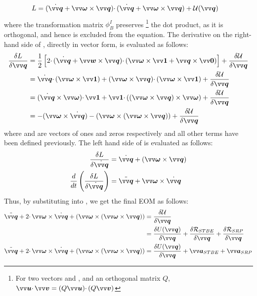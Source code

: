 \begin{align}
    L &= (\dot{\bv{q}} + \bv{\omega} \times \bv{q}) \cdotp (\dot{\bv{q}} + \bv{\omega} \times \bv{q}) + \mathcal{U}(\bv{q})
    \label{eqn:lagrange_arf}
\end{align}
where the transformation matrix $\phi_B^I$ preserves \footnote{For two vectors  and , and an orthogonal matrix $Q$, $\bv{u} \cdotp \bv{v} = (Q\bv{u}) \cdotp (Q\bv{v})$} the dot product, as it is orthogonal, and hence is excluded from the equation. The derivative on the right-hand side of , directly in vector form, is evaluated as follows:
\begin{align}
    \frac{\delta L}{\delta \bv{q}} &= \frac{1}{2} \left[ 2 \cdotp (\dot{\bv{q}} + \bv{w} \times \bv{q}) \cdotp (\bv{\omega} \times \bv{1} + \bv{q} \times {\bv{0}}) \right] + \frac{\delta \mathcal{U}}{\delta \bv{q}} \nonumber \\
    &= \dot{\bv{q}} \cdotp (\bv{\omega} \times \bv{1}) + (\bv{\omega} \times \bv{q}) \cdotp (\bv{\omega} \times \bv{1}) + \frac{\delta \mathcal{U}}{\delta \bv{q}} \nonumber \\
    &= (\dot{\bv{q}} \times \bv{\omega}) \cdotp \bv{1} + \bv{1} \cdotp ((\bv{\omega} \times \bv{q}) \times \bv{\omega}) + \frac{\delta \mathcal{U}}{\delta \bv{q}} \nonumber \\
    &= -(\bv{\omega} \times \dot{\bv{q}}) - (\bv{\omega} \times (\bv{\omega} \times \bv{q})) + \frac{\delta \mathcal{U}}{\delta \bv{q}}
    \label{eqn:lagrangian_RHS}
\end{align}
where  and  are vectors of ones and zeros respectively and all other terms have been defined previously. The left hand side of  is evaluated as follows:
\begin{align}
    \frac{\delta L}{\delta \dot{\bv{q}}} &= \dot{\bv{q}} + (\bv{\omega} \times \bv{q}) \\
    \frac{d}{dt}\left( \frac{\delta L}{\delta \dot{\bv{q}}} \right) &= \ddot{\bv{q}} + \bv{\omega} \times \dot{\bv{q}}
    \label{eqn:lagrangian_LHS}
\end{align}
Thus, by substituting  into , we get the final \gls{EOM} as follows:
\begin{align}
    \ddot{\bv{q}} + 2 \cdotp \bv{\omega} \times \dot{\bv{q}} + (\bv{\omega} \times (\bv{\omega} \times \bv{q})) &= \frac{\delta \mathcal{U}}{\delta \bv{q}} \nonumber \\
    &= \frac{\delta U(\bv{q})}{\delta \bv{q}} + \frac{\delta \mathcal{R}_{STBE}}{\delta \bv{q}} + \frac{\delta \mathcal{R}_{SRP}}{\delta \bv{q}}
    \label{eqn:lagrangian_potential_eval} \\
    \ddot{\bv{q}} + 2 \cdotp \bv{\omega} \times \dot{\bv{q}} + (\bv{\omega} \times (\bv{\omega} \times \bv{q})) &= \frac{\delta U(\bv{q})}{\delta \bv{q}} + \bv{a}_{STBE} + \bv{a}_{SRP}
    \label{eqn:p2bp}
\end{align}

